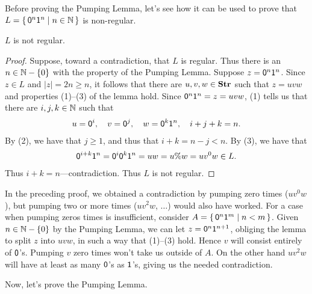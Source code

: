 Before proving the Pumping Lemma, let's see how it can be used to
prove that $L=\{ \, \mathsf{0}^n\mathsf{1}^n \mid n\in\mathbb{N} \, \}$ is non-regular.

\begin{proposition}
\label{NonRegularProp1}
$L$ is not regular.
\end{proposition}

\begin{proof}
Suppose, toward a contradiction, that $L$ is regular.
Thus there is an $n\in\mathbb{N}-\{0\}$ with the property of the Pumping Lemma.
Suppose $z=\mathsf{0}^n\mathsf{1}^n$.  Since $z\in L$ and
$|z|=2n\geq n$, it follows that there are $u,v,w\in\mathbf{Str}$ such that
$z=uvw$ and properties (1)--(3) of the lemma hold.  Since
$\mathsf{0}^n\mathsf{1}^n=z=uvw$, (1) tells us that
there are $i,j,k\in\mathbb{N}$ such that
\begin{gather*}
u=\mathsf{0}^i,\quad
v=\mathsf{0}^j,\quad
w=\mathsf{0}^k\mathsf{1}^n,\quad
i+j+k=n .
\end{gather*}
By (2), we have that
$j\geq 1$, and thus that $i+k = n - j < n$.  By
(3), we have that
\begin{gather*}
\mathsf{0}^{i+k}\mathsf{1}^n=\mathsf{0}^i\mathsf{0}^k\mathsf{1}^n=uw=u\%w=uv^0w\in L .
\end{gather*}
Thus $i+k=n$---contradiction.  Thus $L$ is not regular.
\end{proof}

In the preceding proof, we obtained a contradiction by pumping zero
times ($uv^0w$), but pumping two or more times ($uv^2w$, $\ldots$) would
also have worked.  For a case when pumping zeros times is
insufficient, consider $A=\{ \, \mathsf{0}^n\mathsf{1}^m \mid n<m \, \}$.  Given
$n\in\mathbb{N}-\{0\}$ by the Pumping Lemma, we can let
$z=\mathsf{0}^n\mathsf{1}^{n+1}$, obliging the lemma to split $z$ into $uvw$,
in such a way that (1)--(3) hold.  Hence $v$ will consist entirely of
$\mathsf{0}$'s.  Pumping $v$ zero times won't take us outside of $A$.  On
the other hand $uv^2w$ will have at least as many $\mathsf{0}$'s as
$\mathsf{1}$'s, giving us the needed contradiction.

Now, let's prove the Pumping Lemma.

